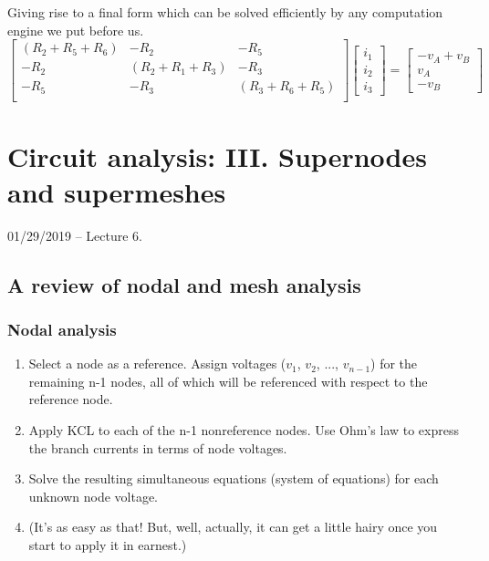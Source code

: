 \documentclass[11pt]{book}
\begin{document}
Giving rise to a final form which can be solved efficiently by any computation engine we put before us.
\begin{equation}
	\begin{bmatrix}
		(R_2 + R_5 + R_6) & -R_2 & -R_5 \\
		-R_2 & (R_2 + R_1 + R_3) & -R_3 \\
		-R_5 & -R_3 & (R_3 + R_6 + R_5) \\
	\end{bmatrix}
	\begin{bmatrix}
		i_1 \\ i_2 \\ i_3
	\end{bmatrix}
	=
	\begin{bmatrix}
		-v_A + v_B \\ v_A \\ -v_B
	\end{bmatrix}
\end{equation}



\chapter{Circuit analysis: III. Supernodes and supermeshes}
01/29/2019 – Lecture 6. 
\minitoc
\newpage
\section{A review of nodal and mesh analysis}
\subsection{Nodal analysis}
\begin{enumerate}
	\item Select a node as a reference. Assign voltages ($v_1$, $v_2$, ..., $v_{n-1}$) for the remaining n-1 nodes, all of which will be referenced with respect to the reference node.
	\item Apply KCL to each of the n-1 nonreference nodes. Use Ohm’s law to express the branch currents in terms of node voltages.
	\item Solve the resulting simultaneous equations (system of equations) for each unknown node voltage.
	\item (It’s as easy as that! But, well, actually, it can get a little hairy once you start to apply it in earnest.)
\end{enumerate}

\newpage
\end{document}
